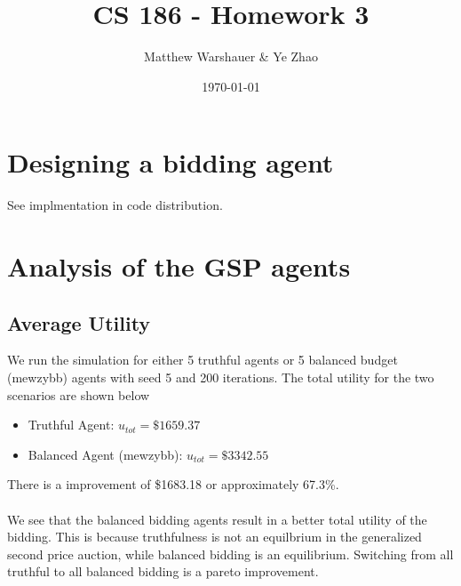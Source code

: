 \documentclass[11pt]{article}
\title{\bf CS 186 - Homework 3}
\date{\today}
\author{Matthew Warshauer \& Ye Zhao}
\begin{document}
\maketitle
\section{Designing a bidding agent}
See implmentation in code distribution.
\section{Analysis of the GSP agents}
\subsection{Average Utility}
We run the simulation for either 5 truthful agents or 5 balanced budget (mewzybb) agents with seed 5 and 200 iterations. The total utility for the two scenarios are shown below
\begin{itemize}
\item Truthful Agent: $u_{tot}=\$1659.37$
\item Balanced Agent (mewzybb): $u_{tot}=\$3342.55$
\end{itemize}
There is a improvement of \$1683.18 or approximately 67.3\%.
\\
\\
We see that the balanced bidding agents result in a better total utility of the bidding. This is because truthfulness is not an equilbrium in the generalized second price auction, while balanced bidding is an equilibrium. Switching from all truthful to all balanced bidding is a pareto improvement.
\end{document}
